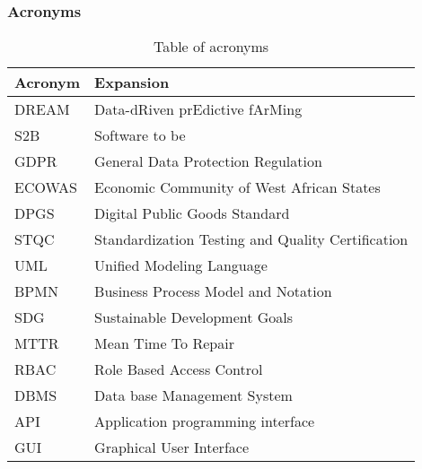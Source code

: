 \subsubsection{Acronyms}
\begin{table}[H]
    \setlength\arrayrulewidth{1pt}
    \centering
    \begin{tabular}{|l|l|}
        \rowcolor{myblue}
        \hline
        \color{white}Acronym & \color{white}Expansion \\
        \hline
        \textsc{DREAM}  &    Data-dRiven prEdictive fArMing \\
        \hline
        \textsc{S2B}     &   Software to be \\
        \hline
        \textsc{GDPR}  &    General Data Protection Regulation\\
        \hline
        \textsc{ECOWAS}  &    Economic Community of West African States\\
        \hline
        \textsc{DPGS}  &    Digital Public Goods Standard\\
        \hline
        \textsc{STQC}  &    Standardization Testing and Quality Certification\\
        \hline
        \textsc{UML}  &    Unified Modeling Language\\
        \hline
        \textsc{BPMN}  &    Business Process Model and Notation\\
        \hline
        \textsc{SDG}  &    Sustainable Development Goals\\
        \hline
        \textsc{MTTR}  &    Mean Time To Repair\\
        \hline
        \textsc{RBAC}  &    Role Based Access Control \\
        \hline
        \textsc{DBMS}  &    Data base Management System \\
        \hline
        \textsc{API}  &    Application programming interface \\
        \hline
        \textsc{GUI}  &    Graphical User Interface \\
        \hline
    \end{tabular}
    
    \caption{\label{tab:acronymsTable}Table of acronyms}
    
\end{table}

